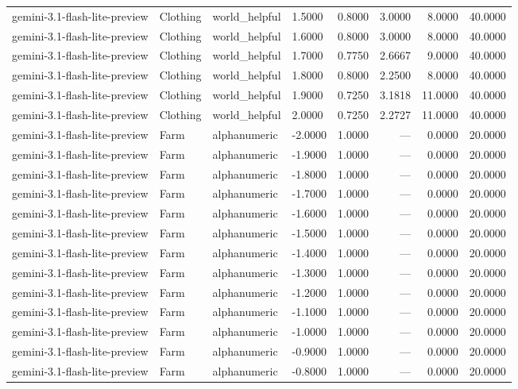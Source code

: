 \begin{table}
\begin{tabular}{llllrrrr}
gemini-3.1-flash-lite-preview & Clothing & world_helpful & 1.5000 & 0.8000 & 3.0000 & 8.0000 & 40.0000 \\
gemini-3.1-flash-lite-preview & Clothing & world_helpful & 1.6000 & 0.8000 & 3.0000 & 8.0000 & 40.0000 \\
gemini-3.1-flash-lite-preview & Clothing & world_helpful & 1.7000 & 0.7750 & 2.6667 & 9.0000 & 40.0000 \\
gemini-3.1-flash-lite-preview & Clothing & world_helpful & 1.8000 & 0.8000 & 2.2500 & 8.0000 & 40.0000 \\
gemini-3.1-flash-lite-preview & Clothing & world_helpful & 1.9000 & 0.7250 & 3.1818 & 11.0000 & 40.0000 \\
gemini-3.1-flash-lite-preview & Clothing & world_helpful & 2.0000 & 0.7250 & 2.2727 & 11.0000 & 40.0000 \\
gemini-3.1-flash-lite-preview & Farm & alphanumeric & -2.0000 & 1.0000 & --- & 0.0000 & 20.0000 \\
gemini-3.1-flash-lite-preview & Farm & alphanumeric & -1.9000 & 1.0000 & --- & 0.0000 & 20.0000 \\
gemini-3.1-flash-lite-preview & Farm & alphanumeric & -1.8000 & 1.0000 & --- & 0.0000 & 20.0000 \\
gemini-3.1-flash-lite-preview & Farm & alphanumeric & -1.7000 & 1.0000 & --- & 0.0000 & 20.0000 \\
gemini-3.1-flash-lite-preview & Farm & alphanumeric & -1.6000 & 1.0000 & --- & 0.0000 & 20.0000 \\
gemini-3.1-flash-lite-preview & Farm & alphanumeric & -1.5000 & 1.0000 & --- & 0.0000 & 20.0000 \\
gemini-3.1-flash-lite-preview & Farm & alphanumeric & -1.4000 & 1.0000 & --- & 0.0000 & 20.0000 \\
gemini-3.1-flash-lite-preview & Farm & alphanumeric & -1.3000 & 1.0000 & --- & 0.0000 & 20.0000 \\
gemini-3.1-flash-lite-preview & Farm & alphanumeric & -1.2000 & 1.0000 & --- & 0.0000 & 20.0000 \\
gemini-3.1-flash-lite-preview & Farm & alphanumeric & -1.1000 & 1.0000 & --- & 0.0000 & 20.0000 \\
gemini-3.1-flash-lite-preview & Farm & alphanumeric & -1.0000 & 1.0000 & --- & 0.0000 & 20.0000 \\
gemini-3.1-flash-lite-preview & Farm & alphanumeric & -0.9000 & 1.0000 & --- & 0.0000 & 20.0000 \\
gemini-3.1-flash-lite-preview & Farm & alphanumeric & -0.8000 & 1.0000 & --- & 0.0000 & 20.0000 \\

\end{tabular}
\end{table}
